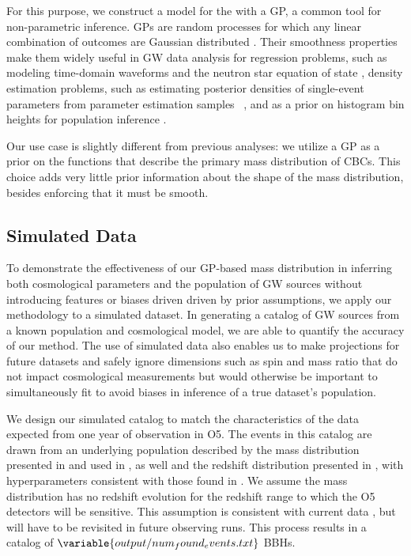\documentclass[preprint2,linenumbers]{aastex631}
\begin{document}
For this purpose, we construct a model for the with a \acf{GP}, a common tool for non-parametric inference. 
\Acp{GP} are random processes for which any linear combination of outcomes are Gaussian distributed \citep{rasmussen_gaussian_2006}.
Their smoothness properties make them widely useful in \ac{GW} data analysis for regression problems, such as modeling time-domain waveforms \citep{doctor_statistical_2017, huerta_eccentric_2018} and the neutron star equation of state \citep{landry_nonparametric_2019}, density estimation problems, such as estimating posterior densities of single-event parameters from parameter estimation samples ~\citep{demilio_density_2021}, and as a prior on histogram bin heights for population inference \citep{mandel_model-independent_2017, li_flexible_2021, ray_non-parametric_2023}.

Our use case is slightly different from previous analyses:
we utilize a \ac{GP} as a prior on the functions that describe the primary mass distribution of \acp{CBC}.
This choice adds very little prior information about the shape of the mass distribution, besides enforcing that it must be smooth.

\subsection{Simulated Data}
To demonstrate the effectiveness of our \ac{GP}-based mass distribution in inferring both cosmological parameters and the population of \ac{GW} sources without introducing features or biases driven driven by prior assumptions, we apply our methodology to a simulated dataset.
In generating a catalog of \ac{GW} sources from a known population and cosmological model, we are able to quantify the accuracy of our method.
The use of simulated data also enables us to make projections for future datasets and safely ignore dimensions such as spin and mass ratio that do not impact cosmological measurements but would otherwise be important to simultaneously fit to avoid biases in inference of a true dataset's population.

We design our simulated catalog to match the characteristics of the data expected from one year of observation in \ac{O5}. 
The events in this catalog are drawn from an underlying population described by the \plp{} mass distribution presented in \citet{talbot_measuring_2018} and used in \citet{abbott_binary_2019, abbott_population_2023}, as well and the redshift distribution presented in \citet{callister_shouts_2020}, with hyperparameters consistent with those found in \citet{abbott_population_2023}.
We assume the mass distribution has no redshift evolution for the redshift range to which the \ac{O5} detectors will be sensitive. 
This assumption is consistent with current data \citep{fishbach_when_2021,van_son_redshift_2022,abbott_population_2023}, but will have to be revisited in future observing runs.
This process results in a catalog of $\variable{output/num_found_events.txt}$ \acp{BBH}.
\end{document}
